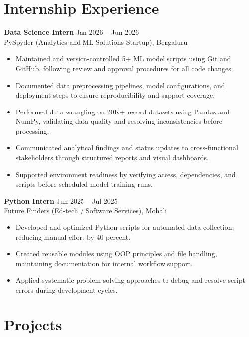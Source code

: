 \documentclass{article}
\begin{document}
\section*{Internship Experience}

\textbf{Data Science Intern} \hfill Jan 2026 -- Jun 2026 \\
PySpyder (Analytics and ML Solutions Startup), Bengaluru
\begin{itemize}
    \item Maintained and version-controlled 5+ ML model scripts using Git and GitHub, following review and approval procedures for all code changes.
    \item Documented data preprocessing pipelines, model configurations, and deployment steps to ensure reproducibility and support coverage.
    \item Performed data wrangling on 20K+ record datasets using Pandas and NumPy, validating data quality and resolving inconsistencies before processing.
    \item Communicated analytical findings and status updates to cross-functional stakeholders through structured reports and visual dashboards.
    \item Supported environment readiness by verifying access, dependencies, and scripts before scheduled model training runs.
\end{itemize}

\vspace{2pt}

\textbf{Python Intern} \hfill Jun 2025 -- Jul 2025 \\
Future Finders (Ed-tech / Software Services), Mohali
\begin{itemize}
    \item Developed and optimized Python scripts for automated data collection, reducing manual effort by 40 percent.
    \item Created reusable modules using OOP principles and file handling, maintaining documentation for internal workflow support.
    \item Applied systematic problem-solving approaches to debug and resolve script errors during development cycles.
\end{itemize}

\vspace{4pt}

\section*{Projects}
\end{document}
